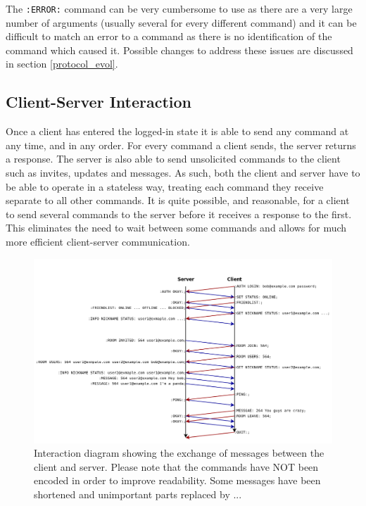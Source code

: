 The \texttt{:ERROR:} command can be very cumbersome to use as there are a very large number of arguments (usually several for every different command) and it can be difficult to match an error to a command as there is no identification of the command which caused it. Possible changes to address these issues are discussed in section \ref{protocol_evol}.

\subsection{Client-Server Interaction}

Once a client has entered the logged-in state it is able to send any command at any time, and in any order. For every command a client sends, the server returns a response. The server is also able to send unsolicited commands to the client such as invites, updates and messages. As such, both the client and server have to be able to operate in a stateless way, treating each command they receive separate to all other commands. It is quite possible, and reasonable, for a client to send several commands to the server before it receives a response to the first. This eliminates the need to wait between some commands and allows for much more efficient client-server communication.

\newpage
\begin{landscape}
    \begin{figure}
        \begin{center}
            \includegraphics[scale=0.60]{Design/diagrams/protocol_interaction.png}
            \caption{Interaction diagram showing the exchange of messages between the client and server. Please note that the commands have NOT been encoded in order to improve readability. Some messages have been shortened and unimportant parts replaced by ...}
            \label{interactionDia}
        \end{center}
    \end{figure}
\end{landscape}

